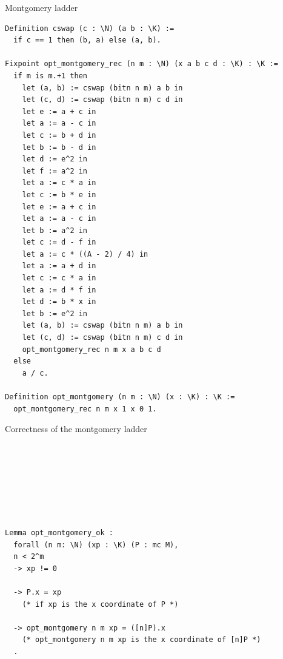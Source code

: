 \documentclass[8pt]{beamer}
\begin{document}
\begin{frame}[fragile]{Montgomery ladder}
\begin{center}
\begin{lstlisting}[language=Coq]
Definition cswap (c : \N) (a b : \K) :=
  if c == 1 then (b, a) else (a, b).

Fixpoint opt_montgomery_rec (n m : \N) (x a b c d : \K) : \K :=
  if m is m.+1 then
    let (a, b) := cswap (bitn n m) a b in
    let (c, d) := cswap (bitn n m) c d in
    let e := a + c in
    let a := a - c in
    let c := b + d in
    let b := b - d in
    let d := e^2 in
    let f := a^2 in
    let a := c * a in
    let c := b * e in
    let e := a + c in
    let a := a - c in
    let b := a^2 in
    let c := d - f in
    let a := c * ((A - 2) / 4) in
    let a := a + d in
    let c := c * a in
    let a := d * f in
    let d := b * x in
    let b := e^2 in
    let (a, b) := cswap (bitn n m) a b in
    let (c, d) := cswap (bitn n m) c d in
    opt_montgomery_rec n m x a b c d
  else
    a / c.

Definition opt_montgomery (n m : \N) (x : \K) : \K :=
  opt_montgomery_rec n m x 1 x 0 1.
\end{lstlisting}
\end{center}
\end{frame}

%
%

\begin{frame}[fragile]{Correctness of the montgomery ladder}
\begin{center}
\begin{lstlisting}[language=Coq, basicstyle=\large]







Lemma opt_montgomery_ok :
  forall (n m: \N) (xp : \K) (P : mc M),
  n < 2^m
  -> xp != 0

  -> P.x = xp
    (* if xp is the x coordinate of P *)

  -> opt_montgomery n m xp = ([n]P).x
    (* opt_montgomery n m xp is the x coordinate of [n]P *)
  .
\end{lstlisting}
\end{center}
\end{frame}

%
%
\end{document}
